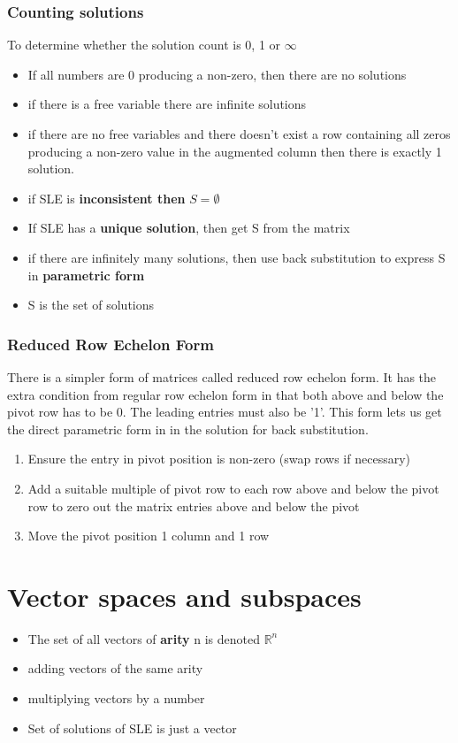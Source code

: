\documentclass[11pt]{book}
\begin{document}
{\subsubsection{Counting solutions}
\par{To determine whether the solution count is 0, 1 or $\infty$}
\begin{itemize}
	\item{If all numbers are 0 producing a non-zero, then there are no solutions}
	\item{if there is a free variable there are infinite solutions}
	\item{if there are no free variables and there doesn't exist a row containing all zeros producing a non-zero value in the augmented column then there is exactly 1 solution.}
\end{itemize}
\begin{itemize}
	\item{if SLE is \textbf{inconsistent then} $S =\emptyset$}
	\item{If SLE has a \textbf{unique solution}, then get S from the matrix}
	\item{if there are infinitely many solutions, then use back substitution to express S in \textbf{parametric form}}
	\item{S is the set of solutions}
\end{itemize}
\subsubsection{Reduced Row Echelon Form}
\par{There is a simpler form of matrices called reduced row echelon form. It has the extra condition from regular row echelon form in that both above and below the pivot row has to be 0. The leading entries must also be '1'. This form lets us get the direct parametric form in in the solution for back substitution.}
\begin{enumerate}
	\item{Ensure the entry in pivot position is non-zero (swap rows if necessary)}
	\item{Add a suitable multiple of pivot row to each row above and below the pivot row to zero out the matrix entries above and below the pivot}
	\item{Move the pivot position 1 column and 1 row}
\end{enumerate}
\section{Vector spaces and subspaces}
\begin{itemize}
	\item{The set of all vectors of \textbf{arity} n is denoted $\mathbb{R}^{n}$}
	\item{adding vectors of the same arity}
	\item{multiplying vectors by a number}
	\item{Set of solutions of SLE is just a vector}
\end{itemize}
}
\end{document}
